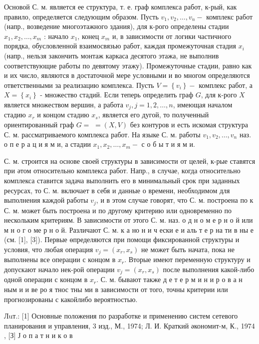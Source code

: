 \documentclass[10pt]{article}
\begin{document}
Основой С. м. является ее структура, т. е. граф комплекса работ, к-рый, как правило, определяется следующим образом. Пусть $v_{1}, v_{2}, \ldots, v_{n}-$ комплекс работ (напр., возведение многоэтажного здания), для к-рого определены стадии $x_{1}, x_{2}, \ldots, x_{m}$ : начало $x_{1}$, конец $x_{m}$ и, в зависимости от логики частичного порядка, обусловленной взаимосвязью работ, каждая промежуточная стадия $x_{i}$ (напр., нельзя закончить монтаж каркаса десятого этажа, не выполнив соответствующие работы по девятому этажу). Промежуточные стадии, равно как и их число, являются в достаточной мере условными и во многом определяются ответственными за реализацию комплекса. Пусть $V=\left\{v_{i}\right\}-$ комплекс работ, а $X=\left\{x_{i}\right\}$ - множество стадий. Если теперь определить граф $G$, для к-рого $X$ является множеством вершин, а работа $v_{j}, j=1,2, \ldots, n$, имеющая началом стадию $x_{r}$ и концом стадию $x_{s}$, является его дугой, то полученный ориентированный граф $G=$ $=(X, V)$ без контуров и есть искомая структура С. м. рассматриваемого комплекса работ. На языке С. м. работы $v_{1}, v_{2}, \ldots, v_{n}$ наз. о п е р а ц и я м и, а стадии $x_{1}, x_{2}, \ldots, x_{m}-$ с о б ы т и я м и.



С. м. строится на основе своей структуры в зависимости от целей, к-рые ставятся при әтом относительно комплекса работ. Напр., в случае, когда относительно комплекса ставится задача выполнить его в минимальный срок при заданных ресурсах, то С. м. включает в себя и данные о времени, необходимом для выполнения каждой работы $v_{j}$, и в этом случае говорят, что С. м. построена по к С. м. может быть построена и по другому критерию или одновременно по нескольким критериям. В зависимости от этого С. м. наз. о д н о м е р н о й или м н о г о ме р н о й. Различают С. м. к а но н и ч ески е и аль т е р на ти в ны е (см. [1], [3]). Первые өпределяются при помощи фиксированной структуры и условия, что любая операция $v_{j}=\left(x_{r}, x_{s}\right)$ не может быть начата, пока не выполнены все операции с концом в $x_{r}$. Вторые имеют переменную структуру и допускают начало нек-рой операции $v_{j}=\left(x_{r}, x_{s}\right)$ после выполнения какой-либо одной операции с концом в $x_{r}$. С. м. бывают также д е т е р м и н и р о в а н ным и и ве ро я тнос тны ми в зависимости от того, точны критерии или прогнозированы с какойлибо вероятностью.



Лuт.: [1] Основные положения по разработке и применению систем сетевого планирования и управления, 3 изд., М., 1974; Л. И. Краткий әкономит-м, К., 1974 , [З] Ј о п а т н и к о в
\end{document}
